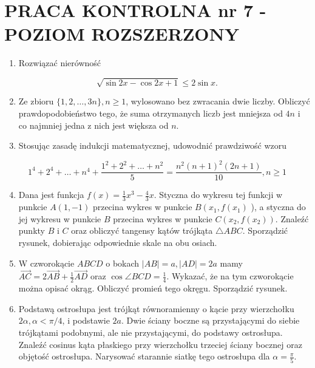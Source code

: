 \documentclass[10pt]{article}
\begin{document}
\section*{PRACA KONTROLNA nr 7 - POZIOM ROZSZERZONY}
\begin{enumerate}
  \item Rozwiązać nierówność
\end{enumerate}

$$
\sqrt{\sin 2 x-\cos 2 x+1} \leqslant 2 \sin x .
$$

\begin{enumerate}
  \setcounter{enumi}{1}
  \item Ze zbioru $\{1,2, \ldots, 3 n\}, n \geqslant 1$, wylosowano bez zwracania dwie liczby. Obliczyć prawdopodobieństwo tego, że suma otrzymanych liczb jest mniejsza od $4 n$ i co najmniej jedna z nich jest większa od $n$.
  \item Stosując zasadę indukcji matematycznej, udowodnić prawdziwość wzoru
\end{enumerate}

$$
1^{4}+2^{4}+\ldots+n^{4}+\frac{1^{2}+2^{2}+\ldots+n^{2}}{5}=\frac{n^{2}(n+1)^{2}(2 n+1)}{10}, n \geqslant 1
$$

\begin{enumerate}
  \setcounter{enumi}{3}
  \item Dana jest funkcja $f(x)=\frac{1}{3} x^{3}-\frac{4}{3} x$. Styczna do wykresu tej funkcji w punkcie $A(1,-1)$ przecina wykres w punkcie $B\left(x_{1}, f\left(x_{1}\right)\right.$ ), a styczna do jej wykresu w punkcie $B$ przecina wykres w punkcie $C\left(x_{2}, f\left(x_{2}\right)\right)$. Znaleźć punkty $B$ i $C$ oraz obliczyć tangensy kątów trójkąta $\triangle A B C$. Sporządzić rysunek, dobierając odpowiednie skale na obu osiach.
  \item W czworokącie $A B C D$ o bokach $|A B|=a,|A D|=2 a$ mamy $\overrightarrow{A C}=2 \overrightarrow{A B}+\frac{1}{2} \overrightarrow{A D}$ oraz $\cos \angle B C D=\frac{1}{4}$. Wykazać, że na tym czworokącie można opisać okrąg. Obliczyć promień tego okręgu. Sporządzić rysunek.
  \item Podstawą ostrosłupa jest trójkąt równoramienny o kącie przy wierzchołku $2 \alpha, \alpha<\pi / 4$, i podstawie $2 a$. Dwie ściany boczne są przystającymi do siebie trójkątami podobnymi, ale nie przystającymi, do podstawy ostrosłupa. Znaleźć cosinus kąta płaskiego przy wierzchołku trzeciej ściany bocznej oraz objętość ostrosłupa. Narysować starannie siatkę tego ostrosłupa dla $\alpha=\frac{\pi}{5}$.
\end{enumerate}
\end{document}
